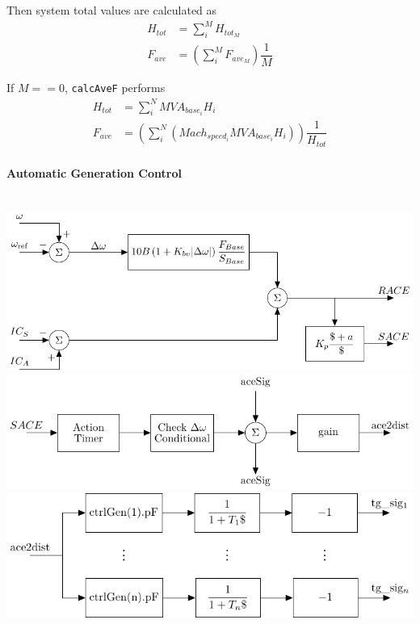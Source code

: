 \documentclass[12pt]{article}
\begin{document}
Then system total values are calculated as
\begin{align*}
H_{tot} &= \sum_{i}^{M} H_{tot_M} \\
F_{ave} &= \left( \sum_{i}^{M} F_{ave_M} \right) \dfrac{1}{M}
\end{align*}

If $M==0$, \verb|calcAveF| performs
\begin{align*}
H_{tot} &= \sum_{i}^{N} MVA_{base_i}H_i \\
F_{ave} &= \left( \sum_{i}^{N}(Mach_{speed_i}MVA_{base_i}H_i) \right) \dfrac{1}{H_{tot}}
\end{align*}

\pagebreak
\paragraph{Automatic Generation Control} \ \\

\includegraphics[width=\linewidth]{200722-AGCblockdiagram-p1} \\%
\includegraphics[width=.95\linewidth]{200722-AGCblockdiagram-p2} \\%
\includegraphics[width=.9\linewidth]{200722-AGCblockdiagram-p3} %
\end{document}
